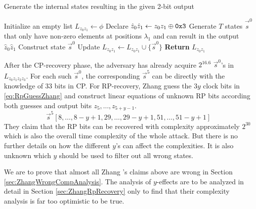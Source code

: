 \begin{algorithm}[htbp]
	\caption{Generate the internal states resulting in the given 2-bit output} \label{alg:getLz0z1}
	\begin{algorithmic}[1]
\State Initialize an empty list $L_{z_0z_1}\leftarrow \phi$
\State Declare $\hat{z}_0\hat{z}_1\leftarrow z_0z_1\oplus {\tt 0x3}$
\State Generate $T$ states $\vec{\hat{s}}^0$ that only have non-zero elements at positions $\lambda_1$ and can result in the output $\hat{z}_0\hat{z}_1$
\State Construct state $\vec{s}^0$
\State Update $L_{z_0z_1}\leftarrow L_{z_0z_1}\cup \{\vec{s}^0\}$
\EndIf
\EndFor
\State \textbf{Return} $L_{z_0z_1}$
		\EndProcedure
	\end{algorithmic}
\end{algorithm}



After the CP-recovery phase, the adversary has already acquire $2^{16.6}$ $\vec{s}^0$'s in $L_{z_0z_1z_2z_3}$.
For each such $\vec{s}^0$, the corresponding $\vec{s}^5$ can be directly with the knowledge of 33 bits in CP.
For RP-recovery, Zhang \etal guess the $3y$ clock bits in \eqref{eq:RpGuessZhang} and construct linear equations of unknown RP bits according both guesses and output bits $z_5,\ldots, z_{5+y-1}$.
\begin{equation}\label{eq:RpGuessZhang}
  \vec{s}^5[8,\ldots, 8-y+1, 29,\ldots, 29-y+1, 51,\ldots, 51-y+1]
\end{equation}
They claim that the RP bits can be recovered with complexity approximately $2^{30}$ which is also the overall time complexity of the whole attack.
But there is no further details on how the different $y$'s can affect the complexities.
It is also unknown which $y$ should be used to filter out all wrong states.

We are to prove that almost all Zhang \etal's claims above are wrong in Section \ref{sec:ZhangWrongCompAnalysis}.
The analysis of $y$-effects are to be analyzed in detail in Section \ref{sec:ZhangRpRecovery} only to find that their complexity analysis is far too optimistic to be true.

